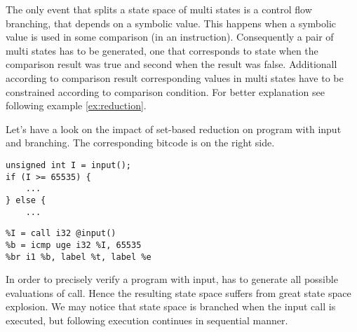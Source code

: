 The only event that splits a state space of multi states is a control flow branching,
that depends on a symbolic value. This happens when a symbolic value is used in
some comparison (in \LLVM an  instruction). Consequently a pair of
multi states has to be generated, one that corresponds to state when the
comparison result was true and second when the result was false. Additionall
according to comparison result corresponding values in multi states have
to be constrained according to comparison condition. For better explanation see
following example \ref{ex:reduction}.

\begin{example}\label{ex:reduction}
Let's have a look on the impact of set-based reduction on program with input and
branching. The corresponding \LLVM bitcode is on the right side.

\begin{center}
\begin{minipage}[t]{.47\textwidth}
\begin{verbatim}
unsigned int I = input();
if (I >= 65535) {
    ...
} else {
    ...
\end{verbatim}
\end{minipage}\hfill
\begin{minipage}[t]{.47\textwidth}
\begin{verbatim}
%I = call i32 @input()
%b = icmp uge i32 %I, 65535
%br i1 %b, label %t, label %e
\end{verbatim}
\end{minipage}
\end{center}

\bigskip
\noindent
In order to precisely verify a program with input, \DIVINE has to generate all
possible evaluations of  call. Hence the resulting state space suffers
from great state space explosion. We may notice that state space is branched when
the input call is executed, but following execution continues in sequential
manner.

\begin{centering}
\end{centering}
\end{example}
